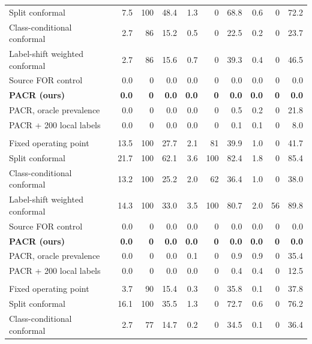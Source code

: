 \begin{table}[!htbp]
\begin{tabular}{@{}lrrrrrrrrr@{}}
\quad Split conformal & 7.5 & 100 & 48.4 & 1.3 & 0 & 68.8 & 0.6 & 0 & 72.2 \\
\quad Class-conditional conformal & 2.7 & 86 & 15.2 & 0.5 & 0 & 22.5 & 0.2 & 0 & 23.7 \\
\quad Label-shift weighted conformal & 2.7 & 86 & 15.6 & 0.7 & 0 & 39.3 & 0.4 & 0 & 46.5 \\
\quad Source FOR control & 0.0 & 0 & 0.0 & 0.0 & 0 & 0.0 & 0.0 & 0 & 0.0 \\
\quad \textbf{PACR (ours)} & \textbf{0.0} & \textbf{0} & \textbf{0.0} & \textbf{0.0} & \textbf{0} & \textbf{0.0} & \textbf{0.0} & \textbf{0} & \textbf{0.0} \\
\quad PACR, oracle prevalence & 0.0 & 0 & 0.0 & 0.0 & 0 & 0.5 & 0.2 & 0 & 21.8 \\
\quad PACR + 200 local labels & 0.0 & 0 & 0.0 & 0.0 & 0 & 0.1 & 0.1 & 0 & 8.0 \\
\addlinespace
\multicolumn{10}{@{}l}{\textit{DDR (native prevalence 44.9\%)}} \\
\quad Fixed operating point & 13.5 & 100 & 27.7 & 2.1 & 81 & 39.9 & 1.0 & 0 & 41.7 \\
\quad Split conformal & 21.7 & 100 & 62.1 & 3.6 & 100 & 82.4 & 1.8 & 0 & 85.4 \\
\quad Class-conditional conformal & 13.2 & 100 & 25.2 & 2.0 & 62 & 36.4 & 1.0 & 0 & 38.0 \\
\quad Label-shift weighted conformal & 14.3 & 100 & 33.0 & 3.5 & 100 & 80.7 & 2.0 & 56 & 89.8 \\
\quad Source FOR control & 0.0 & 0 & 0.0 & 0.0 & 0 & 0.0 & 0.0 & 0 & 0.0 \\
\quad \textbf{PACR (ours)} & \textbf{0.0} & \textbf{0} & \textbf{0.0} & \textbf{0.0} & \textbf{0} & \textbf{0.0} & \textbf{0.0} & \textbf{0} & \textbf{0.0} \\
\quad PACR, oracle prevalence & 0.0 & 0 & 0.0 & 0.1 & 0 & 0.9 & 0.9 & 0 & 35.4 \\
\quad PACR + 200 local labels & 0.0 & 0 & 0.0 & 0.0 & 0 & 0.4 & 0.4 & 0 & 12.5 \\
\addlinespace
\multicolumn{10}{@{}l}{\textit{IDRiD (native prevalence 62.7\%)}} \\
\quad Fixed operating point & 3.7 & 90 & 15.4 & 0.3 & 0 & 35.8 & 0.1 & 0 & 37.8 \\
\quad Split conformal & 16.1 & 100 & 35.5 & 1.3 & 0 & 72.7 & 0.6 & 0 & 76.2 \\
\quad Class-conditional conformal & 2.7 & 77 & 14.7 & 0.2 & 0 & 34.5 & 0.1 & 0 & 36.4 \\

\end{tabular}
\end{table}
